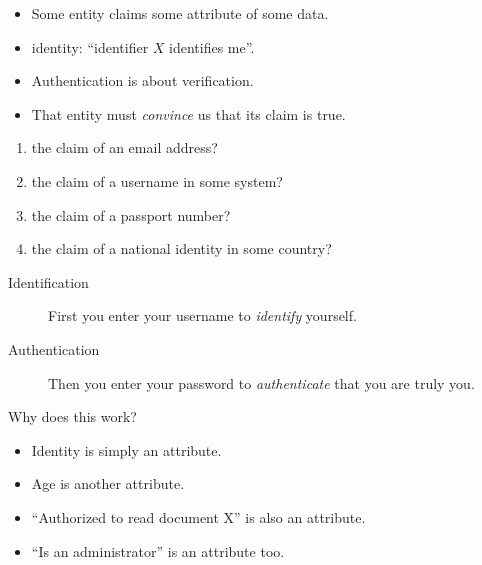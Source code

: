 \begin{frame}
  \begin{definition}[Authentication]
    \begin{itemize}
      \item Some entity claims some attribute of some data.
      \item \Eg identity: \enquote{identifier \(X\) identifies me}.
      \item Authentication is about verification.
      \item That entity must \emph{convince} us that its claim is true.
    \end{itemize}
  \end{definition}

  \pause{}

  \begin{exercise}
    \begin{enumerate}
      \item the claim of an email address?
      \item the claim of a username in some system?
      \item the claim of a passport number?
      \item the claim of a national identity in some country?
    \end{enumerate}
  \end{exercise}
\end{frame}

\begin{frame}
  \begin{example}
    \begin{description}
      \item[Identification] First you enter your username to \emph{identify} 
        yourself.

      \item[Authentication] Then you enter your password to \emph{authenticate} 
        that you are truly you.
    \end{description}
  \end{example}

  \pause{}

  \begin{exercise}
    Why does this work?
  \end{exercise}
\end{frame}

\begin{frame}
  \begin{example}
    \begin{itemize}
      \item Identity is simply an attribute.
      \item Age is another attribute.
      \item \enquote{Authorized to read document X} is also an attribute.
      \item \enquote{Is an administrator} is an attribute too.
    \end{itemize}
  \end{example}
\end{frame}

